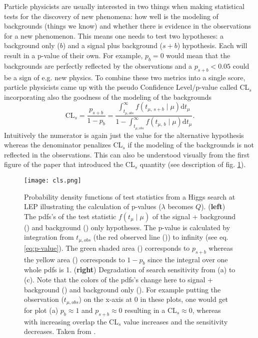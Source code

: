 Particle physicists are usually interested in two things when making statistical tests for the discovery of new phenomena: how well is the modeling of backgrounds (things we know) and whether there is evidence in the observations for a new phenomenon. This means one needs to test two hypotheses: a background only ($b$) and a signal plus background ($s+b$) hypothesis. Each will result in a p-value of their own. For example, $p_{b}=0$ would mean that the backgrounds are perfectly reflected by the observations and a $p_{s+b} < 0.05$ could be a sign of e.g. new physics. To combine these two metrics into a single score, particle physicists came up with the pseudo Confidence Level/p-value called CL$_s$ incorporating also the goodness of the modeling of the backgrounds 
\begin{equation}
    \mathrm{CL}_s=\frac{p_{s+b}}{1-p_{b}}=
    \frac
    {\int_{t_{\mu ,obs}}^{\infty} 
    f(t_{\mu,\,s+b} \mid \mu) \mathrm{d}t_\mu}
    {1-\int_{t_{\mu ,obs}}^{\infty} 
    f(t_{\mu,\,b} \mid \mu) \mathrm{d}t_\mu}.
\end{equation}
Intuitively the numerator is again just the value for the alternative hypothesis whereas the denominator penalizes CL$_s$ if the modeling of the backgrounds is not reflected in the observations. This can also be understood visually from the first figure of the paper that introduced the CL$_s$ quantity \citep{read2002presentation} (see description of fig. \ref{fig:cls}).
\begin{figure}
    \centering
    \texttt{[image: cls.png]}
        \caption[]{Probability density functions of test statistics from a Higgs search at LEP illustrating the calculation of p-values ($\lambda$ becomes $Q$). (\textbf{left}) The \acp{pdf}'s of the test statistic $f(t_\mu \mid \mu)$ of the signal + background ({\color[HTML]{804000}{$\bm{\diagup}$}}) and background ({\color[HTML]{2100FF}{$\bm{\diagup}$}}) only hypotheses. The p-value is calculated by integration from $t_{\mu,obs}$ (the red observed line ({\color[HTML]{FF0000}{$\bm{\diagup}$}})) to infinity (see eq. \ref{eq:p-value}). The green shaded area () corresponds to $p_{s+b}$ whereas the yellow area () corresponds to $1-p_b$ since the integral over one whole \acp{pdf} is 1. (\textbf{right}) Degradation of search sensitivity from (a) to (c). Note that the colors of the \acp{pdf}'s change here to signal + background () and background only (). For example putting the observation ($t_{\mu,obs}$) on the x-axis at 0 in these plots, one would get for plot (a) $p_{b}\approx 1$ and $p_{s+b}\approx 0$ resulting in a CL$_s\approx 0$, whereas with increasing overlap the CL$_s$ value increases and the sensitivity decreases.
        Taken from \citep{read2002presentation}.}
    \label{fig:cls}    
\end{figure}



